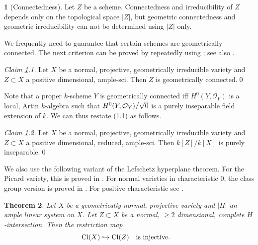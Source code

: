 \documentclass{amsart}
\newtheorem{thm}{Theorem}%
\theoremstyle{definition}
\newtheorem{say}[thm]{}
\theoremstyle{remark}
\renewcommand{\o}[0]{{\mathcal O}}
\newcommand{\qtq}[1]{\quad\mbox{#1}\quad}
\newcommand{\cl}[0]{\operatorname{Cl}}
\def\into{\DOTSB\lhook\joinrel\to}
\begin{document}
\begin{say}[Connectedness]\label{sci.say}
 Let  $Z$ be a scheme. Connectedness and irreducibility of $Z$ depends only on the topological space $|Z|$, but
geometric connectedness and geometric irreducibility can not be determined using $|Z|$ only. 

We frequently need to guarantee that certain schemes   are 
geometrically connected.  
The next criterion can be proved by repeatedly using \cite[II.7.8]{hartsh}; see also \cite{MR0142547}. 
\medskip

{\it Claim \ref{sci.say}.1.} Let $X$ be a normal, projective, geometrically irreducible variety and  $Z\subset X$  a positive dimensional,  
 ample-sci.  Then $Z$ is
geometrically  connected.\qed
\medskip

 Note that  a proper $k$-scheme $Y$ is geometrically connected iff 
$H^0(Y, \o_Y)$ is a  local, Artin $k$-algebra
such that 
$H^0(Y, \o_Y)\big\slash\sqrt{0}$ is a purely inseparable field extension of $k$.  We can thus restate (\ref{sci.say}.1) as follows.
\medskip

{\it Claim \ref{sci.say}.2.} Let $X$ be a normal, projective, geometrically irreducible variety and  $Z\subset X$  a positive dimensional, reduced, 
 ample-sci.  Then $k[Z]/k[X]$ is
purely inseparable.\qed
\end{say}


We also use the following  variant of the Lefschetz hyperplane theorem.
For the Picard variety, this is proved in \cite{sga2}. 
For normal varieties in characteristic 0, the class group version  is proved in \cite{MR2219849, MR2567426}. For positive characteristic see \cite{ji-tocome}. 

\begin{thm}\label{gnl-sri.thm} 
Let $X$ be a geometrically normal, projective variety
and $|H|$ an ample  linear system  on $X$. Let $Z\subset X$ be a normal, $\geq 2$ dimensional,  complete $H$-intersection. Then 
the restriction map 
$$
\cl(X)\into \cl(Z)\qtq{is injective.}
$$ 
\end{thm}
\end{document}
